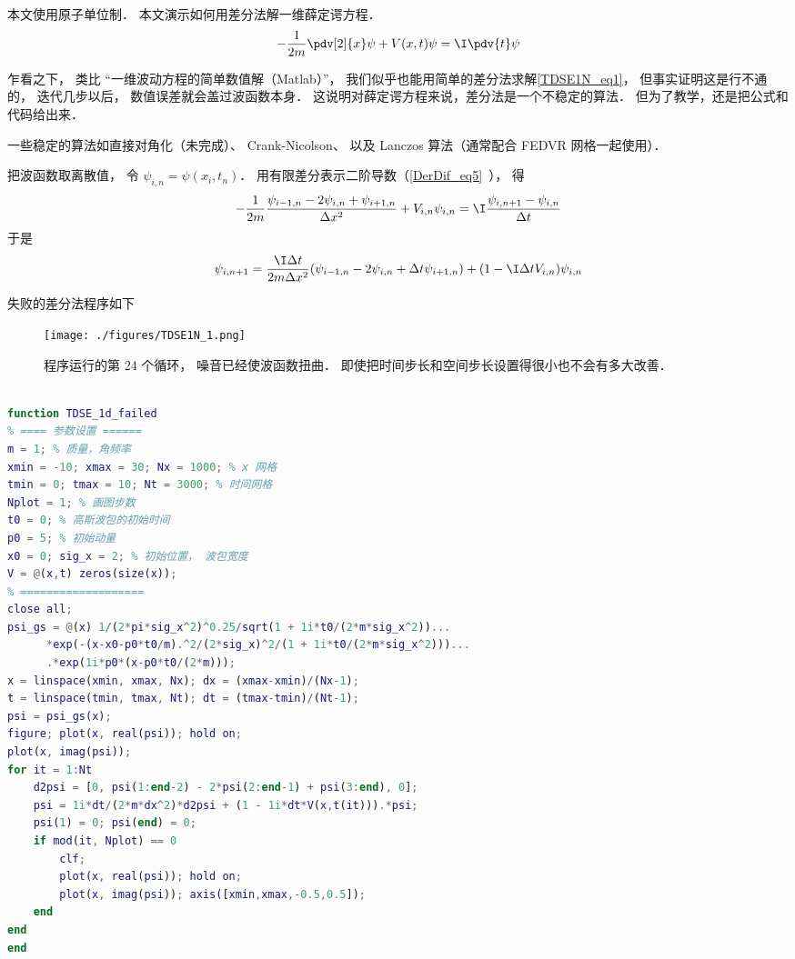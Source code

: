 

本文使用原子单位制． 本文演示如何用差分法解一维薛定谔方程．
\begin{equation}\label{TDSE1N_eq1}
-\frac{1}{2m}\pdv[2]{x}\psi + V(x,t)\psi = \I\pdv{t}\psi
\end{equation}

乍看之下， 类比 “一维波动方程的简单数值解（Matlab）”， 我们似乎也能用简单的差分法求解\autoref{TDSE1N_eq1}， 但事实证明这是行不通的， 迭代几步以后， 数值误差就会盖过波函数本身． 这说明对薛定谔方程来说，差分法是一个不稳定的算法． 但为了教学，还是把公式和代码给出来．

一些稳定的算法如直接对角化（未完成）、 Crank-Nicolson、 以及 Lanczos 算法（通常配合 FEDVR 网格一起使用）．

把波函数取离散值， 令 $\psi_{i,n} = \psi(x_i,t_n)$． 用有限差分表示二阶导数（\autoref{DerDif_eq5}~）， 得
\begin{equation}
-\frac{1}{2m}\frac{\psi_{i-1,n} - 2\psi_{i,n} + \psi_{i+1,n}}{\Delta x^2} + V_{i,n}\psi_{i,n} = \I \frac{\psi_{i, n+1} - \psi_{i, n}}{\Delta t}
\end{equation}
于是
\begin{equation}
\psi_{i, n+1} = \frac{\I\Delta t}{2m\Delta x^2} (\psi_{i-1,n} - 2\psi_{i,n} + \Delta t\psi_{i+1,n}) + (1-\I \Delta t V_{i,n})\psi_{i,n}
\end{equation}

失败的差分法程序如下
\begin{figure}[ht]
\centering
\texttt{[image: ./figures/TDSE1N\_1.png]}
\caption{程序运行的第 24 个循环， 噪音已经使波函数扭曲． 即使把时间步长和空间步长设置得很小也不会有多大改善．} \label{TDSE1N_fig1}
\end{figure}

\begin{lstlisting}[language=matlab, caption=TDSE\_1d\_failed.m]
% 差分法解一维薛定谔方程

function TDSE_1d_failed
% ==== 参数设置 ======
m = 1; % 质量，角频率
xmin = -10; xmax = 30; Nx = 1000; % x 网格
tmin = 0; tmax = 10; Nt = 3000; % 时间网格
Nplot = 1; % 画图步数
t0 = 0; % 高斯波包的初始时间
p0 = 5; % 初始动量
x0 = 0; sig_x = 2; % 初始位置， 波包宽度
V = @(x,t) zeros(size(x));
% ===================
close all;
psi_gs = @(x) 1/(2*pi*sig_x^2)^0.25/sqrt(1 + 1i*t0/(2*m*sig_x^2))...
      *exp(-(x-x0-p0*t0/m).^2/(2*sig_x)^2/(1 + 1i*t0/(2*m*sig_x^2)))...
      .*exp(1i*p0*(x-p0*t0/(2*m)));
x = linspace(xmin, xmax, Nx); dx = (xmax-xmin)/(Nx-1);
t = linspace(tmin, tmax, Nt); dt = (tmax-tmin)/(Nt-1);
psi = psi_gs(x);
figure; plot(x, real(psi)); hold on;
plot(x, imag(psi));
for it = 1:Nt
    d2psi = [0, psi(1:end-2) - 2*psi(2:end-1) + psi(3:end), 0];
    psi = 1i*dt/(2*m*dx^2)*d2psi + (1 - 1i*dt*V(x,t(it))).*psi;
    psi(1) = 0; psi(end) = 0;
    if mod(it, Nplot) == 0
        clf;
        plot(x, real(psi)); hold on;
        plot(x, imag(psi)); axis([xmin,xmax,-0.5,0.5]);
    end
end
end
\end{lstlisting}
